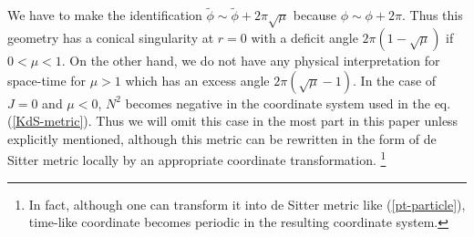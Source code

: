 \documentclass[a4paper,11pt]{article}
\begin{document}
We have to make the identification 
$\tilde{\phi} \sim \tilde{\phi}+2\pi \sqrt{\mu}$ 
because $\phi \sim \phi +2\pi$. 
Thus this geometry has a conical singularity at $r=0$ with a deficit
angle $2\pi\left(1-\sqrt{\mu}\right)$ if $0<\mu < 1$.
On the other hand, we do not have any physical interpretation 
for space-time for $\mu >1$ which has an excess angle 
$2\pi\left(\sqrt{\mu}-1\right)$.
In the case of $J=0$ and $\mu<0$, $N^2$ becomes negative 
in the coordinate system used in the eq.(\ref{KdS-metric}).
Thus we will omit this case in the most part in this paper 
unless explicitly mentioned, 
although this metric can be rewritten in the form of de Sitter
metric locally by an appropriate coordinate transformation.
\footnote{
In fact, although one can transform it into de Sitter metric like 
(\ref{pt-particle}), time-like coordinate becomes periodic 
in the resulting coordinate system.}
\end{document}
